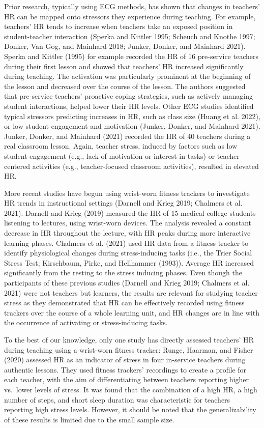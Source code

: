 \documentclass[preprint,
3p]{elsarticle} %
\begin{document}
Prior research, typically using ECG methods, has shown that changes in
teachers' HR can be mapped onto stressors they experience during
teaching. For example, teachers' HR tends to increase when teachers take
an exposed position in student-teacher interaction (Sperka and Kittler
1995; Scheuch and Knothe 1997; Donker, Van Gog, and Mainhard 2018;
Junker, Donker, and Mainhard 2021). Sperka and Kittler (1995) for
example recorded the HR of 16 pre-service teachers during their first
lesson and showed that teachers' HR increased significantly during
teaching. The activation was particularly prominent at the beginning of
the lesson and decreased over the course of the lesson. The authors
suggested that pre-service teachers' proactive coping strategies, such
as actively managing student interactions, helped lower their HR levels.
Other ECG studies identified typical stressors predicting increases in
HR, such as class size (Huang et al. 2022), or low student engagement
and motivation (Junker, Donker, and Mainhard 2021). Junker, Donker, and
Mainhard (2021) recorded the HR of 40 teachers during a real classroom
lesson. Again, teacher stress, induced by factors such as low student
engagement (e.g., lack of motivation or interest in tasks) or
teacher-centered activities (e.g., teacher-focused classroom
activities), resulted in elevated HR.

More recent studies have begun using wrist-worn fitness trackers to
investigate HR trends in instructional settings (Darnell and Krieg 2019;
Chalmers et al. 2021). Darnell and Krieg (2019) measured the HR of 15
medical college students listening to lectures, using wrist-worn
devices. The analysis revealed a constant decrease in HR throughout the
lecture, with HR peaks during more interactive learning phases. Chalmers
et al. (2021) used HR data from a fitness tracker to identify
physiological changes during stress-inducing tasks (i.e., the Trier
Social Stress Test; Kirschbaum, Pirke, and Hellhammer (1993)). Average
HR increased significantly from the resting to the stress inducing
phases. Even though the participants of these previous studies (Darnell
and Krieg 2019; Chalmers et al. 2021) were not teachers but learners,
the results are relevant for studying teacher stress as they
demonstrated that HR can be effectively recorded using fitness trackers
over the course of a whole learning unit, and HR changes are in line
with the occurrence of activating or stress-inducing tasks.

To the best of our knowledge, only one study has directly assessed
teachers' HR during teaching using a wrist-worn fitness tracker: Runge,
Haarman, and Fisher (2020) assessed HR as an indicator of stress in four
in-service teachers during authentic lessons. They used fitness
trackers' recordings to create a profile for each teacher, with the aim
of differentiating between teachers reporting higher vs.~lower levels of
stress. It was found that the combination of a high HR, a high number of
steps, and short sleep duration was characteristic for teachers
reporting high stress levels. However, it should be noted that the
generalizability of these results is limited due to the small sample
size.
\end{document}

